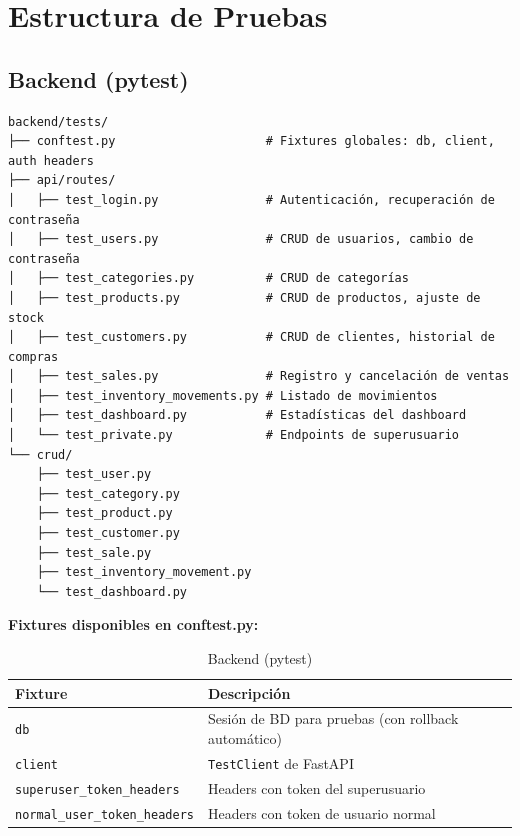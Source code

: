 \section{Estructura de Pruebas}\label{estructura-de-pruebas}

\subsection{Backend (pytest)}\label{backend-pytest}

\begin{verbatim}
backend/tests/
├── conftest.py                     # Fixtures globales: db, client, auth headers
├── api/routes/
│   ├── test_login.py               # Autenticación, recuperación de contraseña
│   ├── test_users.py               # CRUD de usuarios, cambio de contraseña
│   ├── test_categories.py          # CRUD de categorías
│   ├── test_products.py            # CRUD de productos, ajuste de stock
│   ├── test_customers.py           # CRUD de clientes, historial de compras
│   ├── test_sales.py               # Registro y cancelación de ventas
│   ├── test_inventory_movements.py # Listado de movimientos
│   ├── test_dashboard.py           # Estadísticas del dashboard
│   └── test_private.py             # Endpoints de superusuario
└── crud/
    ├── test_user.py
    ├── test_category.py
    ├── test_product.py
    ├── test_customer.py
    ├── test_sale.py
    ├── test_inventory_movement.py
    └── test_dashboard.py
\end{verbatim}

\textbf{Fixtures disponibles en conftest.py:}

\begin{longtable}[]{@{}
  >{\raggedright\arraybackslash}p{}
  >{\raggedright\arraybackslash}p{}@{}}
\caption[Backend (pytest)]{Backend (pytest)}\tabularnewline
\toprule\noalign{}
\begin{minipage}[b]{\linewidth}\raggedright
Fixture
\end{minipage} & \begin{minipage}[b]{\linewidth}\raggedright
Descripción
\end{minipage} \\
\midrule\noalign{}
\endhead
\bottomrule\noalign{}
\endlastfoot
\texttt{db} & Sesión de BD para pruebas (con rollback automático) \\
\texttt{client} & \texttt{TestClient} de FastAPI \\
\texttt{superuser\_token\_headers} & Headers con token del superusuario \\
\texttt{normal\_user\_token\_headers} & Headers con token de usuario normal \\
\end{longtable}

